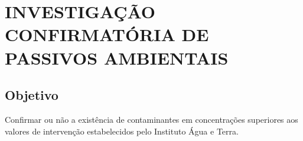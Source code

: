 \chapter{INVESTIGAÇÃO CONFIRMATÓRIA DE PASSIVOS AMBIENTAIS}

\section{Objetivo}

Confirmar ou não a existência de contaminantes em 
concentrações superiores aos valores de intervenção 
estabelecidos pelo Instituto Água e Terra.

